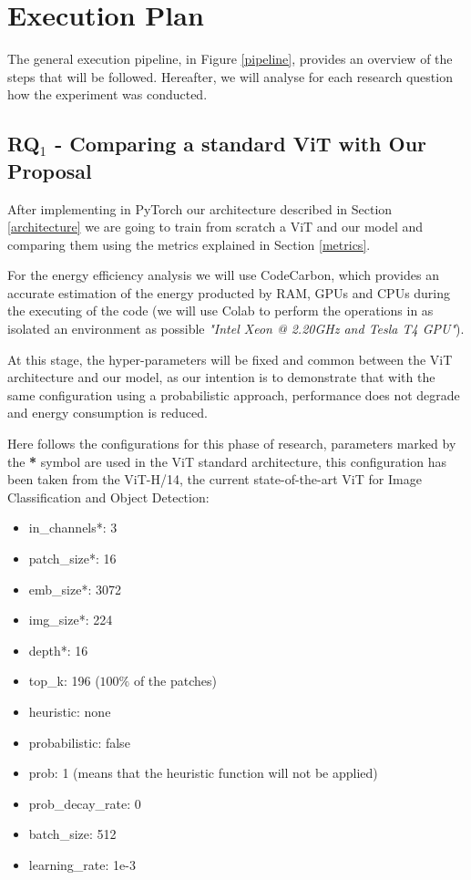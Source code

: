\section{Execution Plan}
\label{executionplan}

The general execution pipeline, in Figure \ref{pipeline}, provides an overview of the steps that will be followed. Hereafter, we will analyse for each research question how the experiment was conducted.
\subsection{\textbf{RQ$_{1}$} - Comparing a standard ViT with Our Proposal} 
After implementing in PyTorch our architecture described in Section \ref{architecture} we are going to train from scratch a ViT and our model and comparing them using the metrics explained in Section \ref{metrics}.

For the energy efficiency analysis we will use CodeCarbon, which provides an accurate estimation of the energy producted by RAM, GPUs and CPUs during the executing of the code (we will use Colab to perform the operations in as isolated an environment as possible \textit{"Intel Xeon @ 2.20GHz and Tesla T4 GPU"}). 

At this stage, the hyper-parameters will be fixed and common between the ViT architecture and our model, as our intention is to demonstrate that with the same configuration using a probabilistic approach, performance does not degrade and energy consumption is reduced.

Here follows the configurations for this phase of research, parameters marked by the \textbf{*} symbol are used in the ViT standard architecture, this configuration has been taken from the ViT-H/14, the current state-of-the-art ViT for Image Classification and Object Detection:

\begin{itemize}
    \item in\_channels*: 3
    \item patch\_size*: 16
    \item emb\_size*: 3072
    \item img\_size*: 224
    \item depth*: 16
    \item top\_k: 196 ($100\%$ of the patches)
    \item heuristic: none
    \item probabilistic: false
    \item prob: 1 (means that the heuristic function will not be applied)
    \item prob\_decay\_rate: 0
    \item batch\_size: 512
    \item learning\_rate: 1e-3
\end{itemize}

